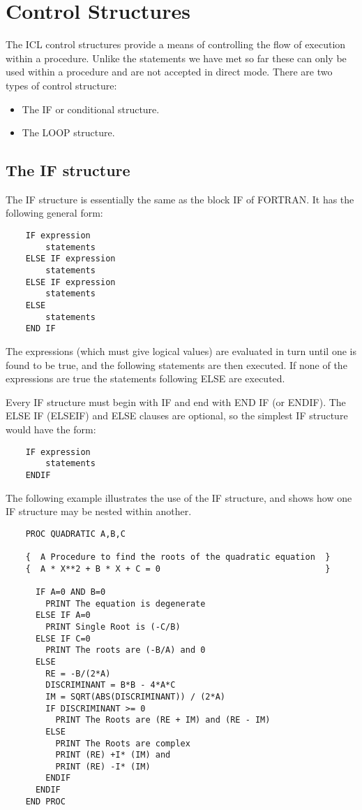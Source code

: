 \documentclass[twoside,11pt]{report}
\newcommand{\xlabel}[1]{}
\begin{document}
\section{\xlabel{control_structures}Control Structures}
The ICL control structures provide a means of controlling the flow of
execution within a procedure. Unlike the statements we have met so far
these can only be used within a procedure and are not accepted in direct mode.
There are two types of control structure:
\begin{itemize}
\item The IF or conditional structure.
\item The LOOP structure.
\end{itemize}
\subsection{\xlabel{the_if_structure}The IF structure}
The IF structure is essentially the same as the block IF of FORTRAN. It
has the following general form:
\begin{verbatim}
    IF expression
        statements
    ELSE IF expression
        statements
    ELSE IF expression
        statements
    ELSE
        statements
    END IF
\end{verbatim}
The expressions (which must give logical values) are evaluated in turn until
one is found to be true, and the following statements are then executed.
If none of the expressions
are true the statements following ELSE are executed.

Every IF structure must begin with IF and end with END IF (or ENDIF). The
ELSE IF (ELSEIF) and ELSE clauses are optional, so the simplest IF structure
would have the form:
\begin{verbatim}
    IF expression
        statements
    ENDIF
\end{verbatim}
The following example illustrates the use of the IF structure, and shows how
one IF structure may be nested within another.
\begin{verbatim}
    PROC QUADRATIC A,B,C

    {  A Procedure to find the roots of the quadratic equation  }
    {  A * X**2 + B * X + C = 0                                 }

      IF A=0 AND B=0
        PRINT The equation is degenerate
      ELSE IF A=0
        PRINT Single Root is (-C/B)
      ELSE IF C=0
        PRINT The roots are (-B/A) and 0
      ELSE
        RE = -B/(2*A)
        DISCRIMINANT = B*B - 4*A*C
        IM = SQRT(ABS(DISCRIMINANT)) / (2*A)
        IF DISCRIMINANT >= 0
          PRINT The Roots are (RE + IM) and (RE - IM)
        ELSE
          PRINT The Roots are complex
          PRINT (RE) +I* (IM) and
          PRINT (RE) -I* (IM)
        ENDIF
      ENDIF
    END PROC
\end{verbatim}
\end{document}
